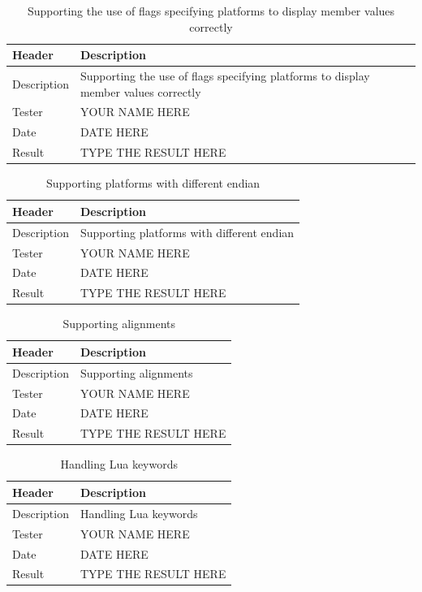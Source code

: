 \begin{table}[!htb] \footnotesize \center
\caption{Supporting the use of flags specifying platforms to display member values correctly \label{tab:sp3TID20}}
\begin{tabular}{l l}
	\toprule
	Header & Description \\
	\midrule
	Description & Supporting the use of flags specifying platforms to display member values correctly \\
	Tester & YOUR NAME HERE\\
	Date & DATE HERE\\
	Result & TYPE THE RESULT HERE\\
	\bottomrule
\end{tabular}
\end{table}

\begin{table}[!htb] \footnotesize \center
\caption{Supporting platforms with different endian \label{tab:sp3TID21}}
\begin{tabular}{l l}
	\toprule
	Header & Description \\
	\midrule
	Description & Supporting platforms with different endian \\
	Tester & YOUR NAME HERE\\
	Date & DATE HERE\\
	Result & TYPE THE RESULT HERE\\
	\bottomrule
\end{tabular}
\end{table}

\begin{table}[!htb] \footnotesize \center
\caption{Supporting alignments \label{tab:sp3TID22}}
\begin{tabular}{l l}
	\toprule
	Header & Description \\
	\midrule
	Description & Supporting alignments \\
	Tester & YOUR NAME HERE\\
	Date & DATE HERE\\
	Result & TYPE THE RESULT HERE\\
	\bottomrule
\end{tabular}
\end{table}

\begin{table}[!htb] \footnotesize \center
\caption{Handling Lua keywords \label{tab:sp3TID22}}
\begin{tabular}{l l}
	\toprule
	Header & Description \\
	\midrule
	Description & Handling Lua keywords \\
	Tester & YOUR NAME HERE\\
	Date & DATE HERE\\
	Result & TYPE THE RESULT HERE\\
	\bottomrule
\end{tabular}
\end{table}

